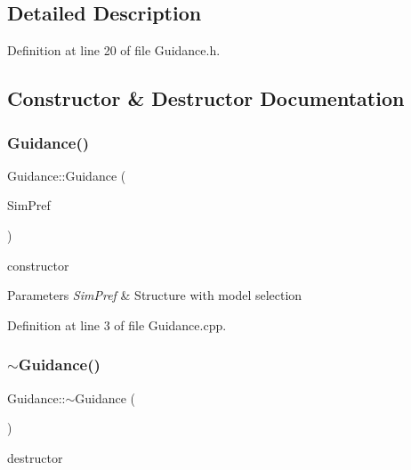 \subsection{Detailed Description}


Definition at line 20 of file Guidance.\+h.



\subsection{Constructor \& Destructor Documentation}
\mbox{\label{class_guidance_a8703d25e590e6f8aa308780200ba091a}} 
\subsubsection{\texorpdfstring{Guidance()}{Guidance()}}
{\footnotesize\ttfamily Guidance\+::\+Guidance (\begin{DoxyParamCaption}\item[{Sim\+D\+Preference \&}]{Sim\+Pref }\end{DoxyParamCaption})}



constructor 


\begin{DoxyParams}{Parameters}
{\em Sim\+Pref} & Structure with model selection \\
\hline
\end{DoxyParams}


Definition at line 3 of file Guidance.\+cpp.

\mbox{\label{class_guidance_ad14ccf81d6a06ec9333d921c7b8f2927}} 
\subsubsection{\texorpdfstring{$\sim$\+Guidance()}{~Guidance()}}
{\footnotesize\ttfamily Guidance\+::$\sim$\+Guidance (\begin{DoxyParamCaption}{ }\end{DoxyParamCaption})}



destructor 



